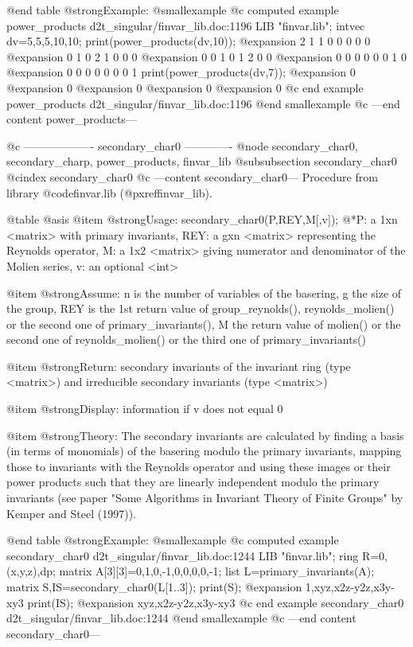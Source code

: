 @end table
@strong{Example:}
@smallexample
@c computed example power_products d2t_singular/finvar_lib.doc:1196 
LIB "finvar.lib";
intvec dv=5,5,5,10,10;
print(power_products(dv,10));
@expansion{}      2     1     1     0     0     0     0     0
@expansion{}      0     1     0     2     1     0     0     0
@expansion{}      0     0     1     0     1     2     0     0
@expansion{}      0     0     0     0     0     0     1     0
@expansion{}      0     0     0     0     0     0     0     1
print(power_products(dv,7));
@expansion{}      0
@expansion{}      0
@expansion{}      0
@expansion{}      0
@expansion{}      0
@c end example power_products d2t_singular/finvar_lib.doc:1196
@end smallexample
@c ---end content power_products---

@c ------------------- secondary_char0 -------------
@node secondary_char0, secondary_charp, power_products, finvar_lib
@subsubsection secondary_char0
@cindex secondary_char0
@c ---content secondary_char0---
Procedure from library @code{finvar.lib} (@pxref{finvar_lib}).

@table @asis
@item @strong{Usage:}
secondary_char0(P,REY,M[,v]);
@*P: a 1xn <matrix> with primary invariants, REY: a gxn <matrix>
representing the Reynolds operator, M: a 1x2 <matrix> giving numerator
and denominator of the Molien series, v: an optional <int>

@item @strong{Assume:}
n is the number of variables of the basering, g the size of the group,
REY is the 1st return value of group_reynolds(), reynolds_molien() or
the second one of primary_invariants(), M the return value of molien()
or the second one of reynolds_molien() or the third one of
primary_invariants()

@item @strong{Return:}
secondary invariants of the invariant ring (type <matrix>) and
irreducible secondary invariants (type <matrix>)

@item @strong{Display:}
information if v does not equal 0

@item @strong{Theory:}
The secondary invariants are calculated by finding a basis (in terms
of monomials) of the basering modulo the primary invariants, mapping
those to invariants with the Reynolds operator and using these images
or their power products such that they are linearly independent modulo
the primary invariants (see paper "Some Algorithms in Invariant
Theory of Finite Groups" by Kemper and Steel (1997)).

@end table
@strong{Example:}
@smallexample
@c computed example secondary_char0 d2t_singular/finvar_lib.doc:1244 
LIB "finvar.lib";
ring R=0,(x,y,z),dp;
matrix A[3][3]=0,1,0,-1,0,0,0,0,-1;
list L=primary_invariants(A);
matrix S,IS=secondary_char0(L[1..3]);
print(S);
@expansion{} 1,xyz,x2z-y2z,x3y-xy3
print(IS);
@expansion{} xyz,x2z-y2z,x3y-xy3
@c end example secondary_char0 d2t_singular/finvar_lib.doc:1244
@end smallexample
@c ---end content secondary_char0---

